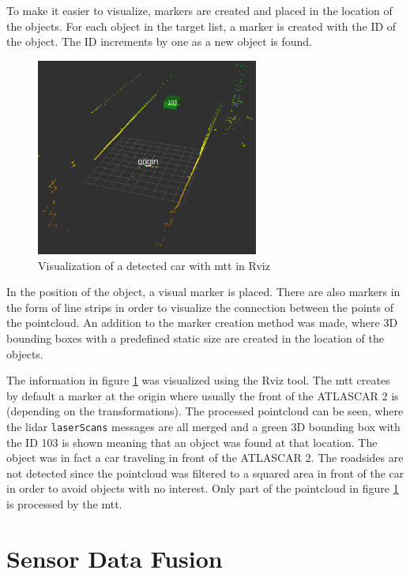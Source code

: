 To make it easier to visualize, markers are created and placed in the location of the objects. For each object in the target list, a marker is created with the ID of the object. The ID increments by one as a new object is found. 

\begin{figure}[htp]
	
	\centering
	\includegraphics[width=0.65\textwidth]{caplabel/imgs/rviz1.png}
	
	\caption{Visualization of a detected car with \gls{mtt} in Rviz}
	\label{fig:rviz1}
	
\end{figure}

In the position of the object, a visual marker is placed. There are also markers in the form of line strips in order to visualize the connection between the points of the pointcloud. An addition to the marker creation method was made, where 3D bounding boxes with a predefined static size are created in the location of the objects.

The information in figure \ref{fig:rviz1} was visualized using the Rviz tool. The \gls{mtt} creates by default a marker at the origin where usually the front of the ATLASCAR 2 is (depending on the transformations). The processed pointcloud can be seen, where the \gls{lidar} \texttt{laserScans} messages are all merged and a green 3D bounding box with the ID 103 is shown meaning that an object was found at that location. The object was in fact a car traveling in front of the ATLASCAR 2. The roadsides are not detected since the pointcloud was filtered to a squared area in front of the car in order to avoid objects with no interest. Only part of the pointcloud in figure \ref{fig:rviz1} is processed by the \gls{mtt}.

\section{Sensor Data Fusion}

